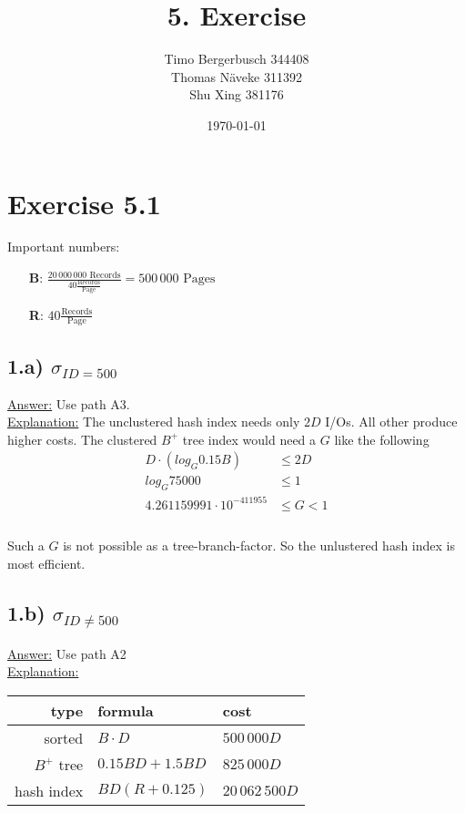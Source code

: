 \documentclass[12pt]{article}
\begin{document}
	
	\title{5. Exercise}
	\author{Timo Bergerbusch 344408 \\ Thomas Näveke 311392 \\ Shu Xing 381176}
	\date{\specialdate\today}
	\maketitle
	
	\section*{Exercise 5.1}
	Important numbers:\\
	\begin{itemize}
		\item[\textbf{B}:] $\frac{20\,000\,000 \text{ Records}}{40 \frac{\text{Records}}{\text{Page}}}= 500\,000 \text{ Pages}$
		\item[\textbf{R}:] $40 \frac{\text{Records}}{\text{Page}}$
	\end{itemize}
	\subsection*{1.a) $\sigma_{ID=500}$}
		\underline{Answer:} Use path A3. \\
		\underline{Explanation:} The unclustered hash index needs only $2D$ I/Os. All other produce higher costs. The clustered $B^+$ tree index would need a $G$ like the following
		\begin{align*}
			D\cdot(log_G 0.15B) &\le 2D \\        
			log_G 75000 &\le 1 \\
			4.261159991\cdot10^{-411955} &\le G < 1\\
		\end{align*}\\
		Such a $G$ is not possible as a tree-branch-factor. So the unlustered hash index is most efficient.
	\subsection*{1.b) $\sigma_{ID\neq 500}$}
		\underline{Answer:} Use path A2\\
		\underline{Explanation:} \\
			\begin{tabular} {r | l |l}
				type & formula & cost \\ \hline
				sorted & $B\cdot D$ & $500\,000D$ \\
				$B^+$ tree & $0.15BD+1.5BD$ & $825\,000D$ \\
				hash index & $BD(R+0.125)$ & $20\,062\,500D$
			\end{tabular}
\end{document}
